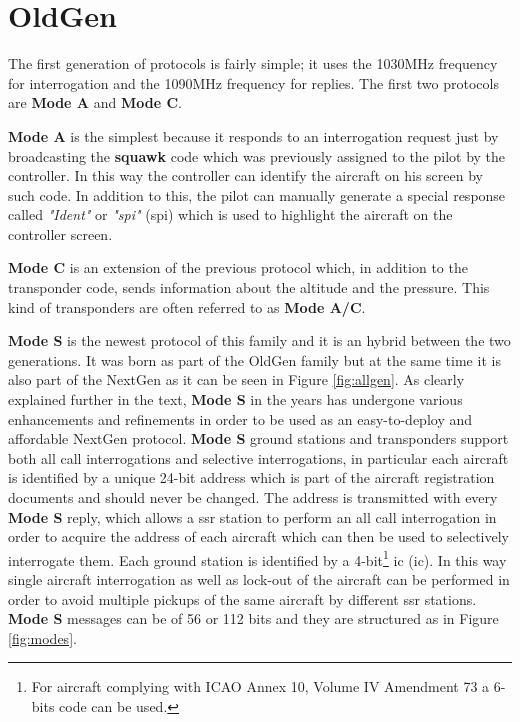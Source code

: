 \documentclass[../main.tex]{subfiles}
\begin{document}
\section{OldGen}

The first generation of protocols is fairly simple; it uses the 1030MHz frequency for interrogation and the 1090MHz frequency for replies.
The first two protocols are \textbf{Mode A} and \textbf{Mode C}.

\textbf{Mode A} is the simplest because it responds to an interrogation request just by broadcasting the \textbf{squawk} code which was previously assigned to the pilot by the controller. In this way the controller can identify the aircraft on his screen by such code. In addition to this, the pilot can manually generate a special response called \textit{"Ident"} or \textit{"\acrshort{spi}"} (\acrlong{spi}) which is used to highlight the aircraft on the controller screen.

\textbf{Mode C} is an extension of the previous protocol which, in addition to the transponder code, sends information about the altitude and the pressure. This kind of transponders are often referred to as \textbf{Mode A/C}.

\textbf{Mode S} is the newest protocol of this family and it is an hybrid between the two generations. It was born as part of the OldGen family but at the same time it is also part of the NextGen as it can be seen in Figure \ref{fig:allgen}. As clearly explained further in the text, \textbf{Mode S} in the years has undergone various enhancements and refinements in order to be used as an easy-to-deploy and affordable NextGen protocol. \textbf{Mode S} ground stations and transponders support both all call interrogations and selective interrogations, in particular each aircraft is identified by a unique 24-bit address which is part of the aircraft registration documents and should never be changed. The address is transmitted with every \textbf{Mode S} reply, which allows a \acrshort{ssr} station to perform an all call interrogation in order to acquire the address of each aircraft which can then be used to selectively interrogate them. Each ground station is identified by a 4-bit\footnote{For aircraft complying with ICAO Annex 10, Volume IV Amendment 73 a 6-bits code can be used.} \acrlong{ic} (\acrshort{ic}). In this way single aircraft interrogation as well as lock-out of the aircraft can be performed in order to avoid multiple pickups of the same aircraft by different \acrshort{ssr} stations. \textbf{Mode S} messages can be of 56 or 112 bits and they are structured as in Figure \ref{fig:modes}.
\end{document}
